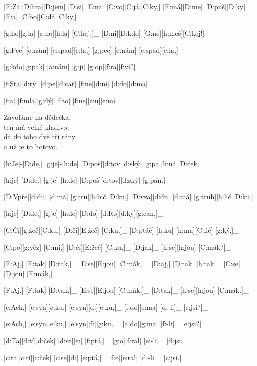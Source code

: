 [F:Za][D:hra][D:jem] [D:si] [E:na] [C:vo][C:já][C:ky,] %
[F:má][D:me] [D:puš][D:ky] [E:a] [C:bo][C:dá][C:ky,]

[g:ho][g:la] [a:ho][h:la] [C:hej,]_
[D:ni][D:kdo] [G:ne][h:meš][C:kej!]



{\minw=6mm
[g:Pec] [e:nám] [e:spad][e:la,] %
[g:pec] [e:nám] [e:spad][e:la,]

[g:kdo][g:pak] [a:nám] [g:ji] [g:op][f:ra][f:ví?]_

[f:Sta][d:rý] [d:pe][d:cař] [f:ne][d:ní] [d:do][d:ma]

[f:a] [f:mla][g:dý] [f:to] [f:ne][e:u][e:mí.]_
}

Zavoláme na dědečka,\\
ten má velké kladivo,\\
dá do toho dvě tři rány\\
a už je to hotovo.



[h:Je]-[D:de,] [g:je]-[h:de] [D:poš][d:tov][d:ský] [g:pa][h:ná][D:ček,] %

[h:je]-[D:de,] [g:je]-[h:de] [D:poš][d:tov][d:ský] [g:pán.]_

[D:Vpře][d:du] [d:má] [g:tru][h:bič][D:ku,] %
[D:vza][d:du] [d:má] [g:truh][h:lič][D:ku,]

[h:je]-[D:de,] [g:je]-[h:de] [D:do] [d:Ro][d:ky][g:can.]_



[C:Čí][g:žeč][C:ku,] [D:čí][E:žeč]-[C:ku,]_
[D:ptáč]-[h:ku] [h:ma][C:lič]-[g:ký,]_

[C:po][g:věz] [C:mi,] [D:čí][E:žeč]-[C:ku,]_
[D:jak]_ [h:se][h:jou] [C:mák?]_

[F:Aj,] [F:tak] [D:tak,]_ [E:se][E:jou] [C:mák,]_
[D:aj,] [D:tak] [h:tak]_ [C:se][D:jou] [E:mák,]_

[F:Aj,] [F:tak] [D:tak,]_ [E:se][E:jou] [C:mák,]_
[D:tak]_ [h:se][h:jou] [C:mák.]_



[c:Ach,] [c:syn][c:ku,] [c:syn][d:][e:ku,]_ [f:do][e:ma] [d:-li]_ [c:jsi?]_

[e:Ach,] [e:syn][e:ku,] [e:syn][f:][g:ku,]_ [a:do][g:ma] [f:-li]_ [e:jsi?] %

[d:Ta][d:tí][d:ček] [d:se][e:] [f:ptá,]_ [g:o][f:ral] [e:-li]_ [d:jsi,] %

[c:ta][c:tí][c:ček] [c:se][d:] [e:ptá,]_ [f:o][e:ral] [d:-li]_ [c:jsi.]_

